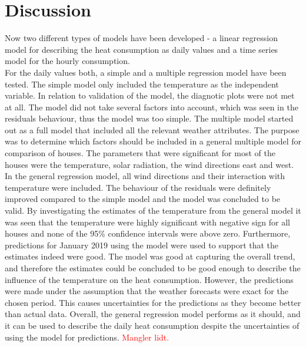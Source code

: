 \chapter{Discussion}
\label{chap: discussion}
Now two different types of models have been developed - a linear regression model for describing the heat consumption as daily values and a time series model for the hourly consumption. \\

\noindent For the daily values both, a simple and a multiple regression model have been tested. The simple model only included the temperature as the independent variable. In relation to validation of the model, the diagnotic plots were not met at all. The model did not take several factors into account, which was seen in the residuals behaviour, thus the model was too simple. The multiple model started out as a full model that included all the relevant weather attributes. The purpose was to determine which factors should be included in a general multiple model for comparison of houses. The parameters that were significant for most of the houses were the temperature, solar radiation, the wind directions east and west. In the general regression model, all wind directions and their interaction with temperature were included. The behaviour of the residuals were definitely improved compared to the simple model and the model was concluded to be valid. By investigating the estimates of the temperature from the general model it was seen that the temperature were highly significant with negative sign for all houses and none of the 95\% confidence intervals were above zero. Furthermore, predictions for January 2019 using the model were used to support that the estimates indeed were good. The model was good at capturing the overall trend, and therefore the estimates could be concluded to be good enough to describe the influence of the temperature on the heat consumption. However, the predictions were made under the assumption that the weather forecasts were exact for the chosen period. This causes uncertainties for the predictions as they become better than actual data. Overall, the general regression model performs as it should, and it can be used to describe the daily heat consumption despite the uncertainties of using the model for predictions. \textcolor{red}{Mangler lidt.} \\

